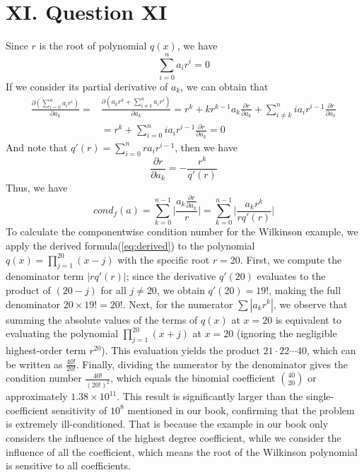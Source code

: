 \documentclass[a4paper]{article}
\begin{document}
\section*{XI. Question XI}

Since $r$ is the root of polynomial $q(x)$, we have
\begin{equation}
  \sum_{i=0}^n a_ir^i=0
\end{equation}
If we consider its partial derivative of $a_k$, we can obtain that
\begin{align}
  \frac{\partial (\sum_{i=0}^n a_ir^i)}{\partial a_k}=&\frac{\partial(a_kr^k+\sum_{i\neq k}^n a_ir^i)}{\partial a_k}=r^k+kr^{k-1}a_k\frac{\partial r}{\partial a_k}+\sum_{i\neq k}^n ia_ir^{i-1}\frac{\partial r}{\partial a_k}\\
  &=r^k+\sum_{i=0}^n ia_ir^{i-1}\frac{\partial r}{\partial a_k}=0
\end{align}
And note that $q'(r)=\sum_{i=0}^nra_ir^{i-1}$, then we have 
\begin{equation}
  \frac{\partial r}{\partial a_k}=-\frac{r^k}{q'(r)}
\end{equation}
Thus, we have
\begin{equation}
  cond_f(a)=\sum_{k=0}^{n-1}\big|\frac{a_k\frac{\partial r}{\partial a_k}}{r}\big|=\sum_{k=0}^{n-1}\big|\frac{a_kr^k}{rq'(r)}\big| \label{eq:derived}
\end{equation}
To calculate the componentwise condition number for the Wilkinson example, we apply the derived formula(\ref{eq:derived}) to the polynomial $q(x) = \prod_{j=1}^{20}(x-j)$ 
with the specific root $r=20$. First, we compute the denominator term $|r q'(r)|$; since the derivative $q'(20)$ evaluates to the product of $(20-j)$ for all $j \ne 20$, we obtain $q'(20) = 19!$, 
making the full denominator $20 \times 19! = 20!$. \newline
Next, for the numerator $\sum |a_k r^k|$, we observe that summing the absolute values of the 
terms of $q(x)$ at $x=20$ is equivalent to evaluating the polynomial $\prod_{j=1}^{20}(x+j)$ at $x=20$ (ignoring the negligible highest-order term $r^{20}$). 
This evaluation yields the product $21\cdot22\cdots40$, which can be written as $\frac{40!}{20!}$. Finally, dividing the numerator by the denominator gives the condition number $\frac{40!}{(20!)^2}$, 
which equals the binomial coefficient $\binom{40}{20}$ or approximately $1.38 \times 10^{11}$. This result is significantly larger than the single-coefficient sensitivity of $10^8$ mentioned in our book, 
confirming that the problem is extremely ill-conditioned. That is because the example in our book only considers the influence of the highest degree coefficient, while we consider the influence of all the coefficient, which means the root
of the Wilkinson polynomial is sensitive to all coefficients.
\end{document}
